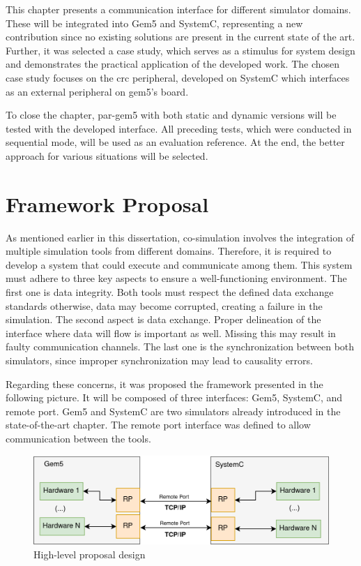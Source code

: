 
This chapter presents a communication interface for different simulator domains. These will be integrated into Gem5 and SystemC, representing 
a new contribution since no existing solutions are present in the current state of the art. Further, it was selected a 
case study, which serves as a stimulus for system design and demonstrates 
the practical application of the developed work. The chosen case study focuses on the \gls{crc} peripheral, developed on SystemC which interfaces 
as an external peripheral on gem5's board. 

To close the chapter, par-gem5 with both static and dynamic versions will be tested with the developed interface. 
All preceding tests, which were conducted in sequential mode, will be used as an evaluation reference. At the end, the 
better approach for various situations will be selected.

\section{Framework Proposal}

As mentioned earlier in this dissertation, co-simulation involves the integration of multiple simulation tools from different
domains. Therefore, it is required to develop a system that could execute and communicate among them. This system must adhere to three key 
aspects to ensure a well-functioning environment. The first one is data integrity. Both tools must respect the defined data exchange standards 
otherwise, data may become corrupted, creating a failure in the simulation. The second aspect is data exchange. Proper delineation of the 
interface where data will flow is important as well. Missing this may result in faulty communication channels. The last one is the synchronization 
between both simulators, since improper synchronization may lead to causality errors.

Regarding these concerns, it was proposed the framework presented in the following picture. It will be composed of three interfaces: Gem5, SystemC, 
and remote port. Gem5 and SystemC are two simulators already introduced in the state-of-the-art chapter. The remote port interface was defined to 
allow communication between the tools.

\begin{figure}[H]
	\centering
 	\includegraphics[width=0.8\linewidth]{Images/CoSimDesignSimplified.png}
 	\caption{High-level proposal design}
	 \label{fig_CoSimDesignSimplified}
\end{figure}

